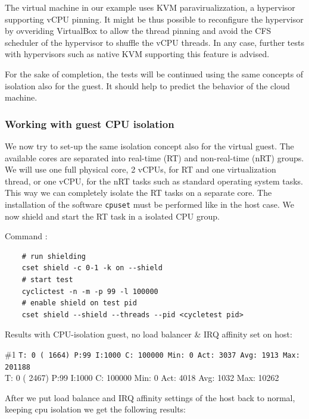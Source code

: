 \documentclass[]{scrartcl}
\begin{document}
The virtual machine in our example uses KVM paravirualizzation, a hypervisor supporting vCPU pinning. It might be thus possible to reconfigure the hypervisor by ovveriding VirtualBox to allow the thread pinning and avoid the CFS scheduler of the hypervisor to shuffle the vCPU threads. In any case, further tests with hypervisors such as native KVM supporting this feature is advised.

For the sake of completion, the tests will be continued using the same concepts of isolation also for the guest. It should help to predict the behavior of the cloud machine.

\subsubsection{Working with guest CPU isolation}

We now try to set-up the same isolation concept also for the virtual guest. The available cores are separated into real-time (RT) and non-real-time (nRT) groups. We will use one full physical core, 2 vCPUs, for RT and one virtualization thread, or one vCPU, for the nRT tasks such as standard operating system tasks. This way we can completely isolate the RT tasks on a separate core. The installation of the software \texttt{cpuset} must be performed like in the host case. We now shield and start the RT task in a isolated CPU group.

\noindent Command : 

\begin{verbatim}
	# run shielding
	cset shield -c 0-1 -k on --shield
	# start test
	cyclictest -n -m -p 99 -l 100000
	# enable shield on test pid
	cset shield --shield --threads --pid <cycletest pid>
\end{verbatim}

\noindent Results with CPU-isolation guest, no load balancer \& IRQ affinity set on host:

\noindent \#1 \small \texttt{T: 0 ( 1664) P:99 I:1000 C: 100000 Min: 0 Act: 3037 Avg: 1913 Max:  201188}\\
T: 0 ( 2467) P:99 I:1000 C: 100000 Min:      0 Act: 4018 Avg: 1032 Max:   10262


After we put load balance and IRQ affinity settings of the host back to normal, keeping cpu isolation we get the following results:
\end{document}
